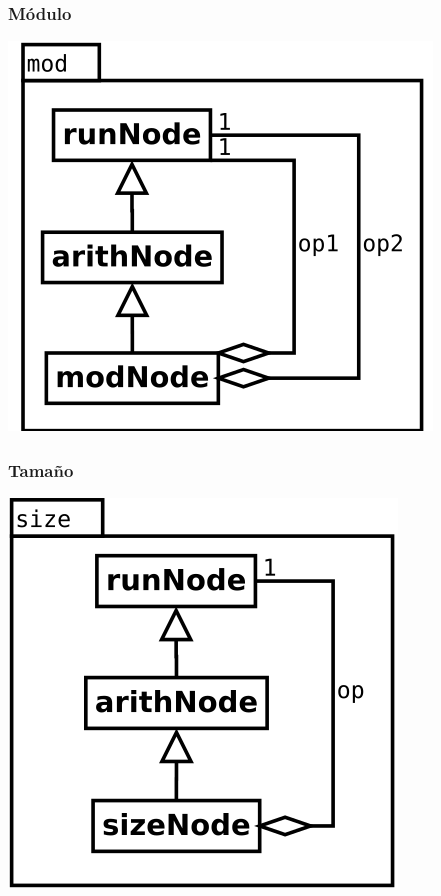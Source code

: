 \subsubsection {Módulo}
\begin{center}
\includegraphics[scale=0.4]{mod.png} \\
\end{center}

\subsubsection {Tamaño}
\begin{center}
\includegraphics[scale=0.4]{size.png} \\
\end{center}

